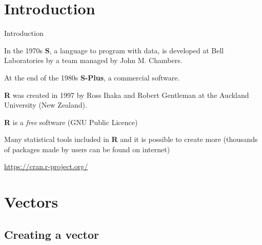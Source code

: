 \documentclass{beamer}
\theoremstyle{example}
\begin{document}



\section{Introduction}

\begin{frame}{Introduction}

In the 1970s \textbf{S}, a language to program with data, is developed
at Bell Laboratories by a team managed by John M. Chambers.\newline

At the end of the 1980s \textbf{S-Plus}, a commercial
software.\newline

\textbf{R} was created in 1997 by Ross Ihaka and Robert Gentleman at
the Auckland University (New Zealand).\newline

\textbf{R} is a \textit{free} software (GNU Public Licence)\newline

Many statistical tools included in \textbf{R} and it is possible to
create more (thousands of packages made by users can be found on
internet)\newline

\url{https://cran.r-project.org/}

\end{frame}



\section{Vectors}

\subsection{Creating a vector}
\end{document}
